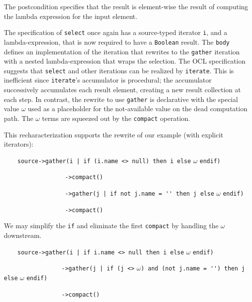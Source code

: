 \documentclass[
]{ceurart}
\begin{document}
The postcondition specifies that the result is element-wise the result of computing the lambda expression for the input element.

The specification of \verb!select! once again has a source-typed iterator \verb!i!, and a lambda-expression, that is now required to have a \verb!Boolean! result. The \verb!body! defines an implementation of the iteration that rewrites to the \verb!gather! iteration with a nested lambda-expression that wraps the selection. The OCL specification suggests that \verb!select! and other iterations can be realized by \verb!iterate!. This is inefficient since \verb!iterate!'s accumulator is procedural; the accumulator successively accumulates each result element, creating a new result collection at each step. In contrast, the rewrite to use \verb!gather! is declarative with the special value $\omega$ used as a placeholder for the not-available value on the dead computation path. The $\omega$ terms are squeezed out by the \verb!compact! operation.

This recharacterization supports the rewrite of our example (with explicit iterators):

\begin{description}[itemsep=-0.2cm]\small\begin{samepage}
\item ~~~~\verb!source->gather(i | if (i.name <> null) then i else! $\omega$ \verb!endif)!
\item ~~~~~~~~~~~~~~~~~~\verb!->compact()!
\item ~~~~~~~~~~~~~~~~~~\verb!->gather(j | if not j.name = '' then j else! $\omega$ \verb!endif)!
\item ~~~~~~~~~~~~~~~~~~\verb!->compact()!
\end{samepage}\end{description}

We may simplify the \verb!if! and eliminate the first \verb!compact! by handling the $\omega$ downstream.

\begin{description}[itemsep=-0.2cm]\small\begin{samepage}
\item ~~~~\verb!source->gather(i | if i.name <> null then i else! $\omega$ \verb!endif)!
\item ~~~~~~~~~~~~~~~~~\verb!->gather(j | if (j <>! $\omega$\verb!) and (not j.name = '') then j else! $\omega$ \verb!endif)!
\item ~~~~~~~~~~~~~~~~~\verb!->compact()!
\end{samepage}\end{description}
\end{document}
